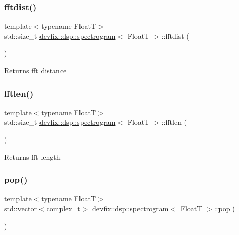 \subsubsection{\texorpdfstring{fftdist()}{fftdist()}}
{\footnotesize\ttfamily template$<$typename FloatT$>$ \\
std\+::size\+\_\+t \hyperlink{structdevfix_1_1dsp_1_1spectrogram}{devfix\+::dsp\+::spectrogram}$<$ FloatT $>$\+::fftdist (\begin{DoxyParamCaption}{ }\end{DoxyParamCaption})\hspace{0.3cm}{\ttfamily [inline]}}

\begin{DoxyReturn}{Returns}
fft distance 
\end{DoxyReturn}
\mbox{\label{structdevfix_1_1dsp_1_1spectrogram_a0989eec947375fa7696feda0f59c1438}} 
\subsubsection{\texorpdfstring{fftlen()}{fftlen()}}
{\footnotesize\ttfamily template$<$typename FloatT$>$ \\
std\+::size\+\_\+t \hyperlink{structdevfix_1_1dsp_1_1spectrogram}{devfix\+::dsp\+::spectrogram}$<$ FloatT $>$\+::fftlen (\begin{DoxyParamCaption}{ }\end{DoxyParamCaption})\hspace{0.3cm}{\ttfamily [inline]}}

\begin{DoxyReturn}{Returns}
fft length 
\end{DoxyReturn}
\mbox{\label{structdevfix_1_1dsp_1_1spectrogram_a9fd6a138c1efb217256677a84906109f}} 
\subsubsection{\texorpdfstring{pop()}{pop()}}
{\footnotesize\ttfamily template$<$typename FloatT$>$ \\
std\+::vector$<$\hyperlink{structdevfix_1_1dsp_1_1spectrogram_a222d1efa23713b334a001e625594b4d4}{complex\+\_\+t}$>$ \hyperlink{structdevfix_1_1dsp_1_1spectrogram}{devfix\+::dsp\+::spectrogram}$<$ FloatT $>$\+::pop (\begin{DoxyParamCaption}{ }\end{DoxyParamCaption})\hspace{0.3cm}{\ttfamily [inline]}}

